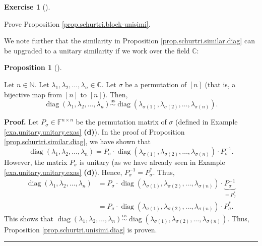 \documentclass[numbers=enddot,12pt,final,onecolumn,notitlepage]{scrartcl}%
\newcounter{exer}
\numberwithin{exer}{subsection}
\theoremstyle{definition}
\newtheorem{prop}[theo]{Proposition}
\newenvironment{proposition}[1][]
{\begin{prop}[#1]\begin{leftbar}}
{\end{leftbar}\end{prop}}
\newtheorem{exmp}[exer]{Exercise}
\newenvironment{exercise}[1][]
{\begin{exmp}[#1]\begin{leftbar}}
{\end{leftbar}\end{exmp}}
\newenvironment{proof}[1][Proof]{\noindent\textbf{#1.} }{\ \rule{0.5em}{0.5em}}
\begin{document}
\begin{exercise}
\label{exe.schurtri.block-unisimi} Prove Proposition
\ref{prop.schurtri.block-unisimi}.
\end{exercise}

We note further that the similarity in Proposition
\ref{prop.schurtri.similar.diag} can be upgraded to a unitary similarity if we
work over the field $\mathbb{C}$:

\begin{proposition}
\label{prop.schurtri.unisimi.diag}Let $n\in\mathbb{N}$. Let $\lambda
_{1},\lambda_{2},\ldots,\lambda_{n}\in\mathbb{C}$. Let $\sigma$ be a
permutation of $\left[  n\right]  $ (that is, a bijective map from $\left[
n\right]  $ to $\left[  n\right]  $). Then,%
\[
\operatorname*{diag}\left(  \lambda_{1},\lambda_{2},\ldots,\lambda_{n}\right)
\overset{\operatorname*{us}}{\sim}\operatorname*{diag}\left(  \lambda
_{\sigma\left(  1\right)  },\lambda_{\sigma\left(  2\right)  },\ldots
,\lambda_{\sigma\left(  n\right)  }\right)  .
\]

\end{proposition}

\begin{proof}
Let $P_{\sigma}\in\mathbb{F}^{n\times n}$ be the permutation matrix of
$\sigma$ (defined in Example \ref{exa.unitary.unitary.exas} \textbf{(d)}). In
the proof of Proposition \ref{prop.schurtri.similar.diag}, we have shown that
\[
\operatorname*{diag}\left(  \lambda_{1},\lambda_{2},\ldots,\lambda_{n}\right)
=P_{\sigma}\cdot\operatorname*{diag}\left(  \lambda_{\sigma\left(  1\right)
},\lambda_{\sigma\left(  2\right)  },\ldots,\lambda_{\sigma\left(  n\right)
}\right)  \cdot P_{\sigma}^{-1}.
\]
However, the matrix $P_{\sigma}$ is unitary (as we have already seen in
Example \ref{exa.unitary.unitary.exas} \textbf{(d)}). Hence, $P_{\sigma}%
^{-1}=P_{\sigma}^{\ast}$. Thus,%
\begin{align*}
\operatorname*{diag}\left(  \lambda_{1},\lambda_{2},\ldots,\lambda_{n}\right)
&  =P_{\sigma}\cdot\operatorname*{diag}\left(  \lambda_{\sigma\left(
1\right)  },\lambda_{\sigma\left(  2\right)  },\ldots,\lambda_{\sigma\left(
n\right)  }\right)  \cdot\underbrace{P_{\sigma}^{-1}}_{=P_{\sigma}^{\ast}}\\
&  =P_{\sigma}\cdot\operatorname*{diag}\left(  \lambda_{\sigma\left(
1\right)  },\lambda_{\sigma\left(  2\right)  },\ldots,\lambda_{\sigma\left(
n\right)  }\right)  \cdot P_{\sigma}^{\ast}.
\end{align*}
This shows that $\operatorname*{diag}\left(  \lambda_{1},\lambda_{2}%
,\ldots,\lambda_{n}\right)  \overset{\operatorname*{us}}{\sim}%
\operatorname*{diag}\left(  \lambda_{\sigma\left(  1\right)  },\lambda
_{\sigma\left(  2\right)  },\ldots,\lambda_{\sigma\left(  n\right)  }\right)
$. Thus, Proposition \ref{prop.schurtri.unisimi.diag} is proven.
\end{proof}
\end{document}
